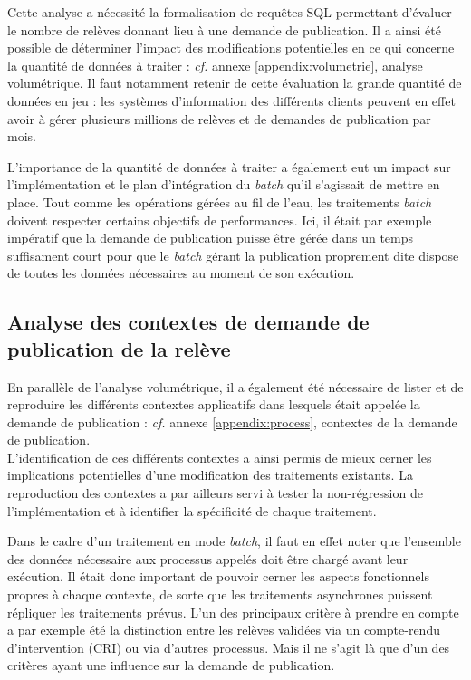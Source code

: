\documentclass[a4paper, 12pt]{report}
\begin{document}
Cette analyse a nécessité la formalisation de requêtes SQL permettant d'évaluer le nombre de relèves donnant lieu à une demande de publication. Il a ainsi été possible de déterminer l'impact des modifications potentielles en ce qui concerne la quantité de données à traiter : \textit{cf.} annexe \ref{appendix:volumetrie}, analyse volumétrique. Il faut notamment retenir de cette évaluation la grande quantité de données en jeu : les systèmes d'information des différents clients peuvent en effet avoir à gérer plusieurs millions de relèves et de demandes de publication par mois.

L'importance de la quantité de données à traiter a également eut un impact sur l'implémentation et le plan d'intégration du \textit{batch} qu'il s'agissait de mettre en place. Tout comme les opérations gérées au fil de l'eau, les traitements \textit{batch} doivent respecter certains objectifs de performances. Ici, il était par exemple impératif que la demande de publication puisse être gérée dans un temps suffisament court pour que le \textit{batch} gérant la publication proprement dite dispose de toutes les données nécessaires au moment de son exécution.

\subsection{Analyse des contextes de demande de publication de la relève}

En parallèle de l'analyse volumétrique, il a également été nécessaire de lister et de reproduire les différents contextes applicatifs dans lesquels était appelée la demande de publication : \textit{cf.} annexe \ref{appendix:process}, contextes de la demande de publication.\\

L'identification de ces différents contextes a ainsi permis de mieux cerner les implications potentielles d'une modification des traitements existants. La reproduction des contextes a par ailleurs servi à tester la non-régression de l'implémentation et à identifier la spécificité de chaque traitement. 

Dans le cadre d'un traitement en mode \textit{batch}, il faut en effet noter que l'ensemble des données nécessaire aux processus appelés doit être chargé avant leur exécution. Il était donc important de pouvoir cerner les aspects fonctionnels propres à chaque contexte, de sorte que les traitements asynchrones puissent répliquer les traitements prévus. L'un des principaux critère à prendre en compte a par exemple été la distinction entre les relèves validées via un compte-rendu d'intervention (CRI) ou via d'autres processus. Mais il ne s'agit là que d'un des critères ayant une influence sur la demande de publication.
\end{document}
